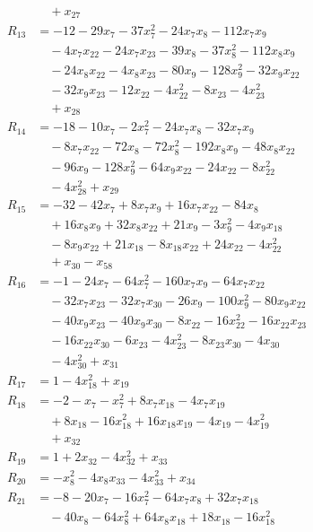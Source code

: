 \begin{align*}
&\quad +x_{27}\\
R_{13} &= -12 -29x_{7} -37x_{7}^{2} -24x_{7}x_{8} -112x_{7}x_{9}\\
&\quad -4x_{7}x_{22} -24x_{7}x_{23} -39x_{8} -37x_{8}^{2} -112x_{8}x_{9}\\
&\quad -24x_{8}x_{22} -4x_{8}x_{23} -80x_{9} -128x_{9}^{2} -32x_{9}x_{22}\\
&\quad -32x_{9}x_{23} -12x_{22} -4x_{22}^{2} -8x_{23} -4x_{23}^{2}\\
&\quad +x_{28}\\
R_{14} &= -18 -10x_{7} -2x_{7}^{2} -24x_{7}x_{8} -32x_{7}x_{9}\\
&\quad -8x_{7}x_{22} -72x_{8} -72x_{8}^{2} -192x_{8}x_{9} -48x_{8}x_{22}\\
&\quad -96x_{9} -128x_{9}^{2} -64x_{9}x_{22} -24x_{22} -8x_{22}^{2}\\
&\quad -4x_{28}^{2} +x_{29}\\
R_{15} &= -32 -42x_{7} +8x_{7}x_{9} +16x_{7}x_{22} -84x_{8}\\
&\quad +16x_{8}x_{9} +32x_{8}x_{22} +21x_{9} -3x_{9}^{2} -4x_{9}x_{18}\\
&\quad -8x_{9}x_{22} +21x_{18} -8x_{18}x_{22} +24x_{22} -4x_{22}^{2}\\
&\quad +x_{30} -x_{58}\\
R_{16} &= -1 -24x_{7} -64x_{7}^{2} -160x_{7}x_{9} -64x_{7}x_{22}\\
&\quad -32x_{7}x_{23} -32x_{7}x_{30} -26x_{9} -100x_{9}^{2} -80x_{9}x_{22}\\
&\quad -40x_{9}x_{23} -40x_{9}x_{30} -8x_{22} -16x_{22}^{2} -16x_{22}x_{23}\\
&\quad -16x_{22}x_{30} -6x_{23} -4x_{23}^{2} -8x_{23}x_{30} -4x_{30}\\
&\quad -4x_{30}^{2} +x_{31}\\
R_{17} &= 1 -4x_{18}^{2} +x_{19}\\
R_{18} &= -2 -x_{7} -x_{7}^{2} +8x_{7}x_{18} -4x_{7}x_{19}\\
&\quad +8x_{18} -16x_{18}^{2} +16x_{18}x_{19} -4x_{19} -4x_{19}^{2}\\
&\quad +x_{32}\\
R_{19} &= 1 +2x_{32} -4x_{32}^{2} +x_{33}\\
R_{20} &= -x_{8}^{2} -4x_{8}x_{33} -4x_{33}^{2} +x_{34}\\
R_{21} &= -8 -20x_{7} -16x_{7}^{2} -64x_{7}x_{8} +32x_{7}x_{18}\\
&\quad -40x_{8} -64x_{8}^{2} +64x_{8}x_{18} +18x_{18} -16x_{18}^{2}\\

\end{align*}
